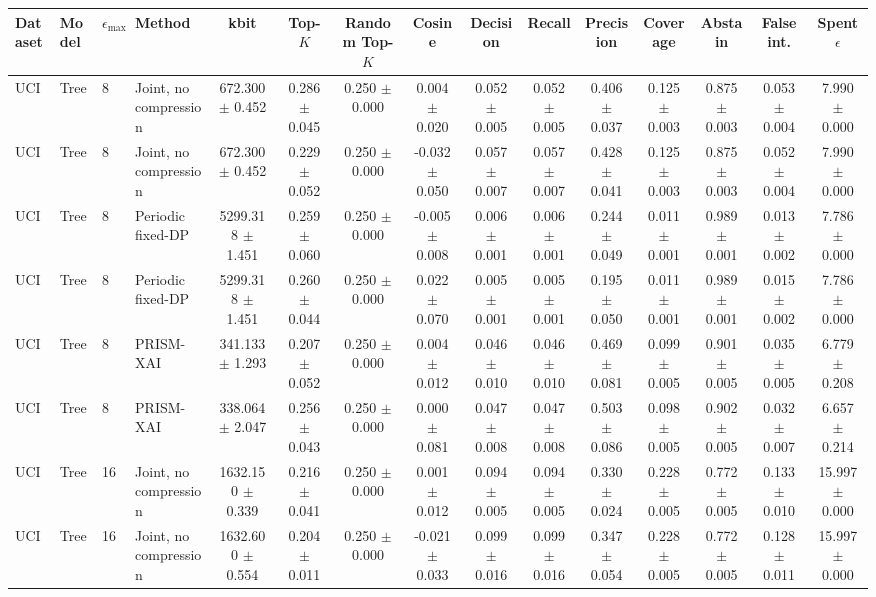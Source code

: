 \begin{tabular}{llllccccccccccc}
\toprule
Dataset & Model & $\epsilon_{\max}$ & Method & kbit & Top-$K$ & Random Top-$K$ & Cosine & Decision & Recall & Precision & Coverage & Abstain & False int. & Spent $\epsilon$ \\
\midrule
UCI & Tree & 8 & Joint, no compression & 672.300 $\pm$ 0.452 & 0.286 $\pm$ 0.045 & 0.250 $\pm$ 0.000 & 0.004 $\pm$ 0.020 & 0.052 $\pm$ 0.005 & 0.052 $\pm$ 0.005 & 0.406 $\pm$ 0.037 & 0.125 $\pm$ 0.003 & 0.875 $\pm$ 0.003 & 0.053 $\pm$ 0.004 & 7.990 $\pm$ 0.000 \\
UCI & Tree & 8 & Joint, no compression & 672.300 $\pm$ 0.452 & 0.229 $\pm$ 0.052 & 0.250 $\pm$ 0.000 & -0.032 $\pm$ 0.050 & 0.057 $\pm$ 0.007 & 0.057 $\pm$ 0.007 & 0.428 $\pm$ 0.041 & 0.125 $\pm$ 0.003 & 0.875 $\pm$ 0.003 & 0.052 $\pm$ 0.004 & 7.990 $\pm$ 0.000 \\
UCI & Tree & 8 & Periodic fixed-DP & 5299.318 $\pm$ 1.451 & 0.259 $\pm$ 0.060 & 0.250 $\pm$ 0.000 & -0.005 $\pm$ 0.008 & 0.006 $\pm$ 0.001 & 0.006 $\pm$ 0.001 & 0.244 $\pm$ 0.049 & 0.011 $\pm$ 0.001 & 0.989 $\pm$ 0.001 & 0.013 $\pm$ 0.002 & 7.786 $\pm$ 0.000 \\
UCI & Tree & 8 & Periodic fixed-DP & 5299.318 $\pm$ 1.451 & 0.260 $\pm$ 0.044 & 0.250 $\pm$ 0.000 & 0.022 $\pm$ 0.070 & 0.005 $\pm$ 0.001 & 0.005 $\pm$ 0.001 & 0.195 $\pm$ 0.050 & 0.011 $\pm$ 0.001 & 0.989 $\pm$ 0.001 & 0.015 $\pm$ 0.002 & 7.786 $\pm$ 0.000 \\
UCI & Tree & 8 & PRISM-XAI & 341.133 $\pm$ 1.293 & 0.207 $\pm$ 0.052 & 0.250 $\pm$ 0.000 & 0.004 $\pm$ 0.012 & 0.046 $\pm$ 0.010 & 0.046 $\pm$ 0.010 & 0.469 $\pm$ 0.081 & 0.099 $\pm$ 0.005 & 0.901 $\pm$ 0.005 & 0.035 $\pm$ 0.005 & 6.779 $\pm$ 0.208 \\
UCI & Tree & 8 & PRISM-XAI & 338.064 $\pm$ 2.047 & 0.256 $\pm$ 0.043 & 0.250 $\pm$ 0.000 & 0.000 $\pm$ 0.081 & 0.047 $\pm$ 0.008 & 0.047 $\pm$ 0.008 & 0.503 $\pm$ 0.086 & 0.098 $\pm$ 0.005 & 0.902 $\pm$ 0.005 & 0.032 $\pm$ 0.007 & 6.657 $\pm$ 0.214 \\
UCI & Tree & 16 & Joint, no compression & 1632.150 $\pm$ 0.339 & 0.216 $\pm$ 0.041 & 0.250 $\pm$ 0.000 & 0.001 $\pm$ 0.012 & 0.094 $\pm$ 0.005 & 0.094 $\pm$ 0.005 & 0.330 $\pm$ 0.024 & 0.228 $\pm$ 0.005 & 0.772 $\pm$ 0.005 & 0.133 $\pm$ 0.010 & 15.997 $\pm$ 0.000 \\
UCI & Tree & 16 & Joint, no compression & 1632.600 $\pm$ 0.554 & 0.204 $\pm$ 0.011 & 0.250 $\pm$ 0.000 & -0.021 $\pm$ 0.033 & 0.099 $\pm$ 0.016 & 0.099 $\pm$ 0.016 & 0.347 $\pm$ 0.054 & 0.228 $\pm$ 0.005 & 0.772 $\pm$ 0.005 & 0.128 $\pm$ 0.011 & 15.997 $\pm$ 0.000 \\

\end{tabular}
